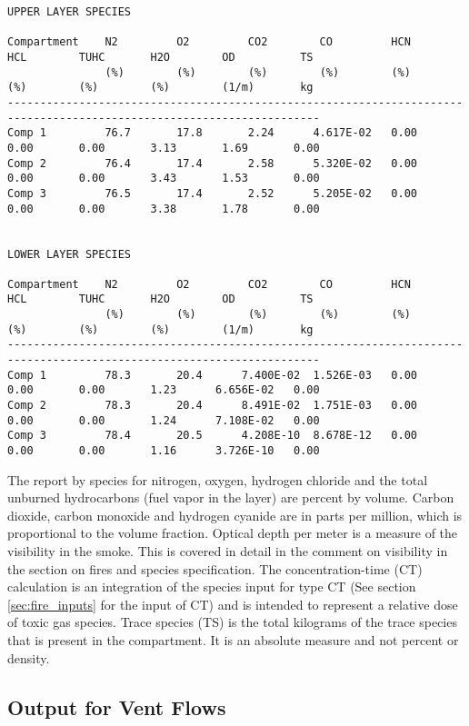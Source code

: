\begin{lstlisting}[basicstyle=\tiny]
UPPER LAYER SPECIES

Compartment    N2         O2         CO2        CO         HCN        HCL        TUHC       H2O        OD          TS
               (%)        (%)        (%)        (%)        (%)        (%)        (%)        (%)        (1/m)       kg
----------------------------------------------------------------------------------------------------------------------
Comp 1         76.7       17.8       2.24      4.617E-02   0.00       0.00       0.00       3.13       1.69       0.00
Comp 2         76.4       17.4       2.58      5.320E-02   0.00       0.00       0.00       3.43       1.53       0.00
Comp 3         76.5       17.4       2.52      5.205E-02   0.00       0.00       0.00       3.38       1.78       0.00


LOWER LAYER SPECIES

Compartment    N2         O2         CO2        CO         HCN        HCL        TUHC       H2O        OD          TS
               (%)        (%)        (%)        (%)        (%)        (%)        (%)        (%)        (1/m)       kg
----------------------------------------------------------------------------------------------------------------------
Comp 1         78.3       20.4      7.400E-02  1.526E-03   0.00       0.00       0.00       1.23      6.656E-02   0.00
Comp 2         78.3       20.4      8.491E-02  1.751E-03   0.00       0.00       0.00       1.24      7.108E-02   0.00
Comp 3         78.4       20.5      4.208E-10  8.678E-12   0.00       0.00       0.00       1.16      3.726E-10   0.00
\end{lstlisting}
The report by species for nitrogen, oxygen, hydrogen chloride and the total unburned hydrocarbons (fuel vapor in the layer) are percent by volume. Carbon dioxide, carbon monoxide and hydrogen cyanide are in parts per million, which is proportional to the volume fraction.  Optical depth per meter is a measure of the visibility in the smoke. This is covered in detail in the comment on visibility in the section on fires and species specification. The concentration-time (CT) calculation is an integration of the species input for type CT (See section \ref{sec:fire_inputs} for the input of CT) and is intended to represent a relative dose of toxic gas species. Trace species (TS) is the total kilograms of the trace species that is present in the compartment. It is an absolute measure and not percent or density.


\subsection{Output for Vent Flows}

